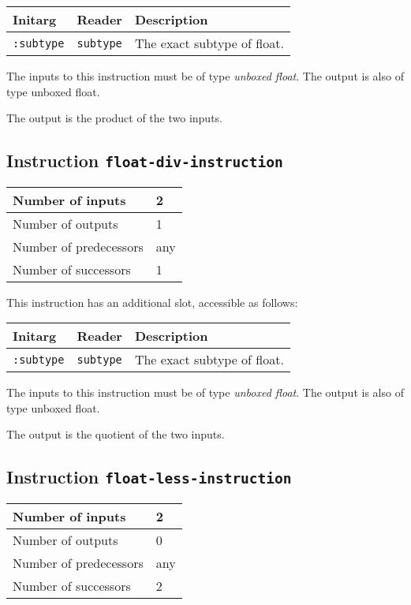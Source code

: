 \begin{tabular}{|l|l|l|}
  \hline
  Initarg & Reader & Description\\
  \hline\hline
  \texttt{:subtype} & \texttt{subtype} & The exact subtype of float.\\
  \hline
\end{tabular}

The inputs to this instruction must be of type \emph{unboxed
  float}. The output is also of type unboxed float.

The output is the product of the two inputs.

\subsection{Instruction \texttt{float-div-instruction}}
\label{hir-instruction-float-div}

\begin{tabular}{|l|l|}
\hline
Number of inputs & 2\\
\hline
Number of outputs & 1\\
\hline
Number of predecessors & any\\
\hline
Number of successors & 1\\
\hline
\end{tabular}

This instruction has an additional slot, accessible as follows:

\begin{tabular}{|l|l|l|}
  \hline
  Initarg & Reader & Description\\
  \hline\hline
  \texttt{:subtype} & \texttt{subtype} & The exact subtype of float.\\
  \hline
\end{tabular}

The inputs to this instruction must be of type \emph{unboxed
  float}. The output is also of type unboxed float.

The output is the quotient of the two inputs.

\subsection{Instruction \texttt{float-less-instruction}}
\label{hir-instruction-float-less}

\begin{tabular}{|l|l|}
\hline
Number of inputs & 2\\
\hline
Number of outputs & 0\\
\hline
Number of predecessors & any\\
\hline
Number of successors & 2\\
\hline
\end{tabular}

